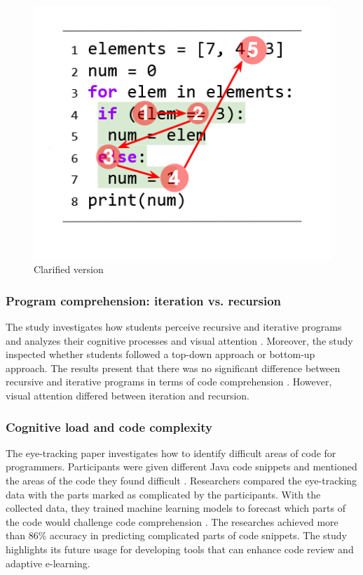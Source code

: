 \begin{figure} [H]
  \centering
  \includegraphics[scale=1]{figures/b.png}
  \caption{Clarified version \citet{silva2023evaluating}}
  \label{fig:AnhangsChor}
\end{figure}


\subsubsection{Program comprehension: iteration vs. recursion} 
The study \citet{aroobaunderstanding} investigates how students perceive recursive and iterative programs and analyzes their cognitive processes and visual attention \citet{aroobaunderstanding}. Moreover, the study inspected whether students followed a top-down approach or bottom-up approach.
The results present that there was no significant difference between recursive and iterative programs in terms of code comprehension \citet{aroobaunderstanding}.  However, visual attention differed between iteration and recursion. 

\subsubsection{Cognitive load and code complexity} 

The eye-tracking paper \citet{abbad2022estimating} investigates how to identify difficult areas of code for programmers.  Participants were given different Java code snippets and mentioned the areas of the code they found difficult \citet{abbad2022estimating}. Researchers compared the eye-tracking data with the parts marked as complicated by the participants. With the collected data, they trained machine learning models to forecast which parts of the code would challenge code comprehension \citet{abbad2022estimating}. The researches achieved more than 86\% accuracy in predicting complicated parts of code snippets. The study highlights its future usage for developing tools that can enhance code review and adaptive e-learning. 



